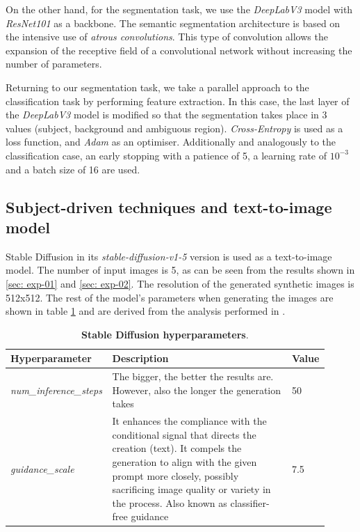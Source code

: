 On the other hand, for the segmentation task, we use the \textit{DeepLabV3} model \cite{chen2017rethinking} with \textit{ResNet101} as a backbone. The semantic segmentation architecture is based on the intensive use of \textit{atrous convolutions}. This type of convolution allows the expansion of the receptive field of a convolutional network without increasing the number of parameters. 

Returning to our segmentation task, we take a parallel approach to the classification task by performing feature extraction. In this case, the last layer of the \textit{DeepLabV3} model is modified so that the segmentation takes place in 3 values (subject, background and ambiguous region). \textit{Cross-Entropy} is used as a loss function, and \textit{Adam} as an optimiser. Additionally and analogously to the classification case, an early stopping with a patience of 5, a learning rate of $10^{-3}$ and a batch size of 16 are used.

\subsection{Subject-driven techniques and text-to-image model}

Stable Diffusion in its \textit{stable-diffusion-v1-5} version is used as a text-to-image model. The number of input images is 5, as can be seen from the results shown in \ref{sec: exp-01} and \ref{sec: exp-02}. The resolution of the generated synthetic images is 512x512. The rest of the model's parameters when generating the images are shown in table \ref{table:TableSDhyperparameters} and are derived from the analysis performed in \cite{stablediffusiondiffusers}.

\begin{table}[ht]
\centering
\begin{tabular}{|p{0.24\linewidth}|p{0.57\linewidth}|p{0.10\linewidth}|}
\hline
\rowcolor[HTML]{AEAAAA} 
\textbf{Hyperparameter} & \textbf{Description} & \textbf{Value} \\ \hline
\textit{num\_inference\_steps} & The bigger, the better the results are. However, also the longer the generation   takes & 50 \\ \hline
\textit{guidance\_scale} & It enhances the compliance with the conditional signal that directs the creation   (text). It compels the generation to align with the given prompt more closely, possibly sacrificing image quality or variety in the process. Also known as classifier-free guidance & 7.5 \\ \hline
\end{tabular}
\caption{\textbf{Stable Diffusion hyperparameters}.}
\label{table:TableSDhyperparameters}
\end{table}

